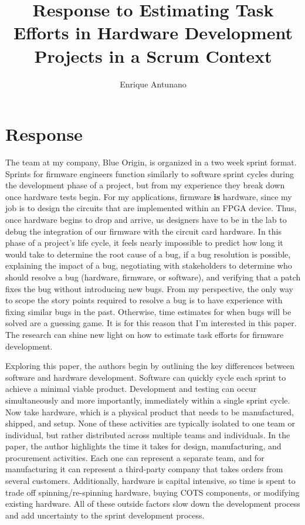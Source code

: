 \documentclass{article}
\title{Response to Estimating Task Efforts in Hardware Development
Projects in a Scrum Context}
\author{Enrique Antunano}
\begin{document}
\maketitle

\section{Response}

The team at my company, Blue Origin, is organized in a two week sprint format.
Sprints for firmware engineers function similarly to software sprint cycles during the development phase of a project, but from my experience they break down once hardware tests begin.
For my applications, firmware \textbf{is} hardware, since my job is to design the circuits that are implemented within an FPGA device. 
Thus, once hardware begins to drop and arrive, us designers have to be in the lab to debug the integration of our firmware with the circuit card hardware. In this phase of a project's life cycle, it feels nearly impossible to predict how long it would take to determine the root cause of a bug, if a bug resolution is possible, explaining the impact of a bug, negotiating with stakeholders to determine who should resolve a bug (hardware, firmware, or software), and verifying that a patch fixes the bug without introducing new bugs.
From my perspective, the only way to scope the story points required to resolve a bug is to have experience with fixing similar bugs in the past.
Otherwise, time estimates for when bugs will be solved are a guessing game.
It is for this reason that I'm interested in this paper.
The research can shine new light on how to estimate task efforts for firmware development.

Exploring this paper, the authors begin by outlining the key differences between software and hardware development.
Software can quickly cycle each sprint to achieve a minimal viable product.
Development and testing can occur simultaneously and more importantly, immediately within a single sprint cycle.
Now take hardware, which is a physical product that needs to be manufactured, shipped, and setup. 
None of these activities are typically isolated to one team or individual, but rather distributed across multiple teams and individuals. 
In the paper, the author highlights the time it takes for design, manufacturing, and procurement activities.
Each one can represent a separate team, and for manufacturing it can represent a third-party company that takes orders from several customers.
Additionally, hardware is capital intensive, so time is spent to trade off spinning/re-spinning hardware, buying COTS components, or modifying existing hardware. 
All of these outside factors slow down the development process and add uncertainty to the sprint development process.
\end{document}
